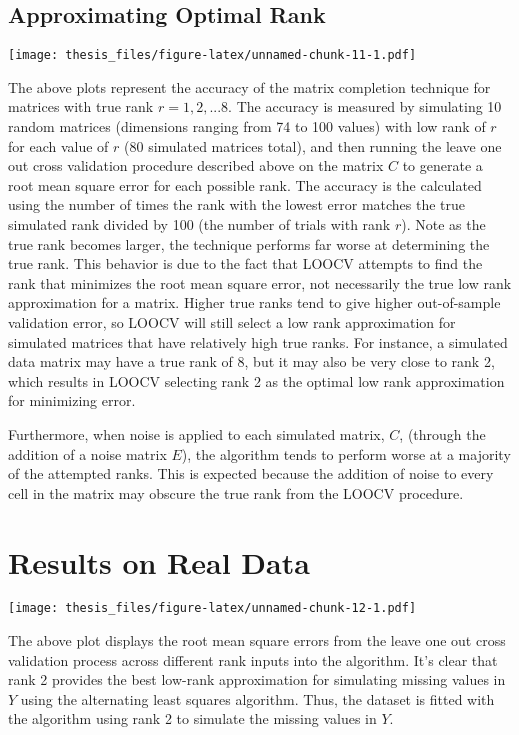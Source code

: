 \documentclass[12pt,twoside]{dukestatscithesis}
\theoremstyle{definition}
\theoremstyle{definition}
\theoremstyle{definition}
\theoremstyle{remark}
\begin{document}
\subsection{Approximating Optimal
Rank}\label{approximating-optimal-rank}

\texttt{[image: thesis\_files/figure-latex/unnamed-chunk-11-1.pdf]}

The above plots represent the accuracy of the matrix completion
technique for matrices with true rank \(r = 1,2,...8\). The accuracy is
measured by simulating 10 random matrices (dimensions ranging from 74 to
100 values) with low rank of \(r\) for each value of \(r\) (80 simulated
matrices total), and then running the leave one out cross validation
procedure described above on the matrix \(C\) to generate a root mean
square error for each possible rank. The accuracy is the calculated
using the number of times the rank with the lowest error matches the
true simulated rank divided by 100 (the number of trials with rank
\(r\)). Note as the true rank becomes larger, the technique performs far
worse at determining the true rank. This behavior is due to the fact
that LOOCV attempts to find the rank that minimizes the root mean square
error, not necessarily the true low rank approximation for a matrix.
Higher true ranks tend to give higher out-of-sample validation error, so
LOOCV will still select a low rank approximation for simulated matrices
that have relatively high true ranks. For instance, a simulated data
matrix may have a true rank of 8, but it may also be very close to rank
2, which results in LOOCV selecting rank 2 as the optimal low rank
approximation for minimizing error.

Furthermore, when noise is applied to each simulated matrix, \(C\),
(through the addition of a noise matrix \(E\)), the algorithm tends to
perform worse at a majority of the attempted ranks. This is expected
because the addition of noise to every cell in the matrix may obscure
the true rank from the LOOCV procedure.

\section{Results on Real Data}\label{results-on-real-data}

\texttt{[image: thesis\_files/figure-latex/unnamed-chunk-12-1.pdf]}

The above plot displays the root mean square errors from the leave one
out cross validation process across different rank inputs into the
algorithm. It's clear that rank 2 provides the best low-rank
approximation for simulating missing values in \(Y\) using the
alternating least squares algorithm. Thus, the dataset is fitted with
the algorithm using rank 2 to simulate the missing values in \(Y\).
\end{document}

